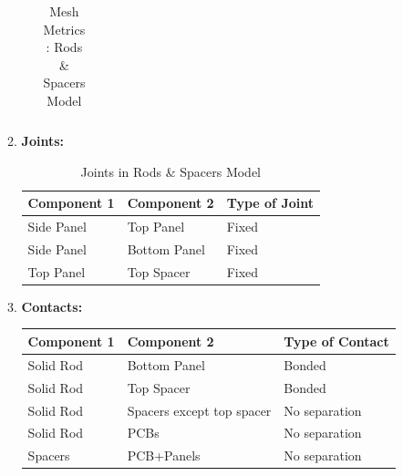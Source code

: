\documentclass[../../main.tex]{subfiles}
\begin{document}
\begin{enumerate}
\begin{enumerate}
\begin{enumerate}
\begin{table}[H]
\begin{tabular}{|p{3.5cm}|p{3.5cm}|p{3cm}|}
                   \hline
                \end{tabular}
                \caption{Mesh Metrics : Rods \& Spacers Model}
                \label{tab:my_label}
            \end{table}
            \end{enumerate}
            \item \textbf{Joints: }
            \begin{table}[H]
                \centering
                \begin{tabular}{|p{3cm}|p{3cm}|p{3cm}|}
                    \hline
                    \textbf{Component 1} & \textbf{Component 2} & \textbf{Type of Joint} \\
                    \hline
                   Side Panel & Top Panel & Fixed  \\
                    \hline
                    Side Panel & Bottom Panel & Fixed \\
                    \hline
                    Top Panel & Top Spacer & Fixed \\
                   \hline
                \end{tabular}
                \caption{Joints in Rods \& Spacers Model}
                \label{tab:my_label}
            \end{table}
            \item \textbf{Contacts: }
            \begin{table}[H]
                \centering
                            \begin{tabular}{|p{3cm}|p{5cm}|p{3cm}|}
                    \hline
                    \textbf{Component 1} & \textbf{Component 2} & \textbf{Type of Contact} \\
                    \hline
                   Solid Rod & Bottom Panel& Bonded \\
                    \hline
                    Solid Rod & Top Spacer & Bonded \\
                    \hline
                    Solid Rod & Spacers except top spacer & No separation \\
                    \hline
                    Solid Rod & PCBs & No separation \\
                    \hline
                    Spacers & PCB+Panels & No separation \\
                    \hline


\end{tabular}
\end{table}
\end{enumerate}
\end{enumerate}
\end{document}
